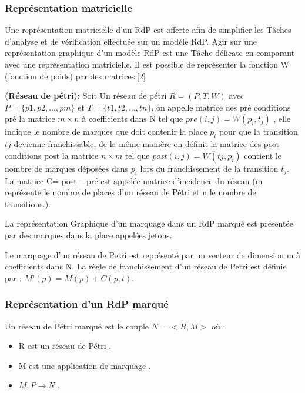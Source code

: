  	 \subsubsection*{ Représentation matricielle} 
 	Une représentation matricielle d'un RdP est offerte afin de simplifier les Tâches d'analyse et de vérification effectuée sur un modèle RdP. Agir sur une représentation graphique d'un modèle RdP est une Tâche délicate en comparant avec une représentation matricielle. Il   est possible de représenter la fonction W (fonction de poids) par des matrices.[2] 
  
  \begin{defn}\textbf{\textbf{(Réseau de pétri):}}
  	Soit Un réseau de pétri $ R= (P, T, W) $ avec $ P= \{p1, p2, …, pm\} $ et $ T= \{t1, t2, …,tn \}$, on appelle matrice des pré conditions   pré la matrice  $  m \times n $   à coefficients dans  N  tel que $ pre (i,j)= W(p_{i}, t_{j}) $ , elle indique le nombre de marques que doit contenir la place $p_{i}$ pour que la transition $ tj $  devienne franchissable, de la même manière on définit la matrice des post conditions post  la matrice $ n  \times m $ tel que $ post (i,j)= W(tj,  p_{i}) $ contient le nombre de   marques déposées dans $p_{i}$ lors du franchissement de la transition $t_{j}$. La matrice C= post – pré est appelée matrice d'incidence du réseau (m représente le nombre de places d'un réseau de Pétri et n le nombre de transitions.). 
  \end{defn}

La représentation Graphique d’un marquage dans un RdP marqué est présentée par des marques dans la place appelées jetons. 

Le marquage d'un réseau de Petri est représenté par un vecteur de dimension m à coefficients dans N. La règle de franchissement d'un réseau de Petri est définie par :    $     M’ (p) =M (p) +  C (p, t).  $
  
  
  
  \subsubsection*{Représentation d’un RdP marqué }

Un réseau de Pétri marqué est le couple $ N = < R , M > $ où : 
\begin{itemize}
	\item R est un réseau de Pétri .
		\item M est une application de marquage  .
		\item $  M : P \to N  $ .
\end{itemize}


